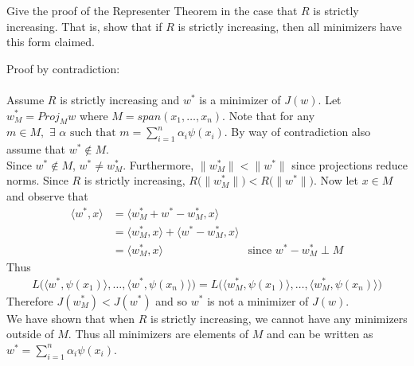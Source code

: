 \documentclass[12pt,letterpaper]{article}
\begin{document}
\begin{problem}{7.2}
Give the proof of the Representer Theorem in the case that $R$ is
strictly increasing. That is, show that if $R$ is strictly increasing,
then all minimizers have this form claimed.
\end{problem}
\begin{solution}{}
    Proof by contradiction:\\
    \\
    Assume $R$ is strictly increasing and $w^*$ is a minimizer of $J(w)$. Let $w_M^* = Proj_Mw$ where $M = span(x_1, \ldots, x_n)$. 
    Note that for any $m\in M, \,\, \exists\,\, \alpha\,\, \text{such that}\,\, m=\sum_{i=1}^{n}\alpha_{i}\psi(x_{i})$. By way of contradiction 
    also assume that $w^* \notin M$.\\
    
    Since $w^* \notin M$, $w^* \neq w_M^*$. Furthermore, $\|w_M^*\| < \|w^*\|$ since projections reduce norms. Since $R$ is strictly increasing, 
    $R\big(\|w_M^*\|\big) < R\big(\|w^*\|\big)$. Now let $x\in M$ and observe that
    \begin{align*}
        \langle w^*,x\rangle &= \langle w_M^*+w^*-w_M^*, x\rangle\\
        &= \langle w_M^*,x\rangle + \langle w^*-w_M^*, x\rangle\\
        &= \langle w_M^*, x\rangle & \text{since $w^*-w_M^* \perp M$}
    \end{align*}
    Thus 
    \begin{align*}
        L\big(\langle w^*,\psi(x_1)\rangle, \ldots,\langle w^*,\psi(x_n)\rangle\big) = L\big(\langle w_M^*,\psi(x_1)\rangle, \ldots,\langle w_M^*,\psi(x_n)\rangle\big)
    \end{align*}
    Therefore $J(w_M^*) < J(w^*)$ and so $w^*$ is not a minimizer of $J(w)$.\\
    
    We have shown that when $R$ is strictly increasing, we cannot have any minimizers outside of $M$. Thus all minimizers are elements of $M$ 
    and can be written as $w^*=\sum_{i=1}^{n}\alpha_{i}\psi(x_{i})$.
\end{solution}
\end{document}
